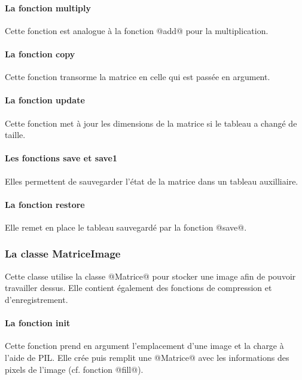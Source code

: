 \documentclass{article}
\begin{document}
\paragraph{La fonction multiply}

Cette fonction est analogue à la fonction @add@ pour la multiplication.

\paragraph{La fonction copy}

Cette fonction transorme la matrice en celle qui est passée en argument.

\paragraph{La fonction update}

Cette fonction met à jour les dimensions de la matrice si le tableau a changé de taille.

\paragraph{Les fonctions save et save1} 

Elles permettent de sauvegarder l'état de la matrice dans un tableau auxilliaire.

\paragraph{La fonction restore}

Elle remet en place le tableau sauvegardé par la fonction @save@.


\subsubsection{La classe MatriceImage}

Cette classe utilise la classe @Matrice@ pour stocker une image afin de pouvoir travailler dessus. Elle contient également des fonctions de compression et d'enregistrement.

\paragraph{La fonction init}

Cette fonction prend en argument l'emplacement d'une image et la charge à l'aide de PIL. Elle crée puis remplit une @Matrice@ avec les informations des pixels de l'image (cf. fonction @fill@).
\end{document}
